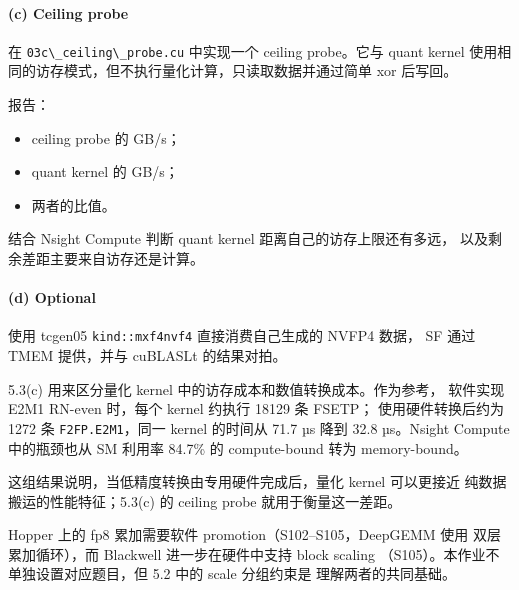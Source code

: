 \documentclass[11pt,a4paper,fontset=none]{ctexart}
\providecommand{\tightlist}{\setlength{\itemsep}{0pt}\setlength{\parskip}{0pt}}
\providecommand{\passthrough}[1]{#1}
\begin{document}
\hypertarget{c-ceiling-probe}{%
\paragraph{(c) Ceiling probe}\label{c-ceiling-probe}}

在 \passthrough{\lstinline!03c\_ceiling\_probe.cu!} 中实现一个 ceiling
probe。它与 quant kernel
使用相同的访存模式，但不执行量化计算，只读取数据并通过简单 xor 后写回。

报告：

\begin{itemize}
\tightlist
\item
  ceiling probe 的 GB/s；
\item
  quant kernel 的 GB/s；
\item
  两者的比值。
\end{itemize}

结合 Nsight Compute 判断 quant kernel 距离自己的访存上限还有多远，
以及剩余差距主要来自访存还是计算。

\hypertarget{d-optional}{%
\paragraph{(d) Optional}\label{d-optional}}

使用 tcgen05 \passthrough{\lstinline!kind::mxf4nvf4!} 直接消费自己生成的
NVFP4 数据， SF 通过 TMEM 提供，并与 cuBLASLt 的结果对拍。

\begin{lookback}

5.3(c) 用来区分量化 kernel 中的访存成本和数值转换成本。作为参考，
软件实现 E2M1 RN-even 时，每个 kernel 约执行 18129 条 FSETP；
使用硬件转换后约为 1272 条 \passthrough{\lstinline!F2FP.E2M1!}，同一
kernel 的时间从 71.7 µs 降到 32.8 µs。Nsight Compute 中的瓶颈也从 SM
利用率 84.7\% 的 compute-bound 转为 memory-bound。

这组结果说明，当低精度转换由专用硬件完成后，量化 kernel 可以更接近
纯数据搬运的性能特征；5.3(c) 的 ceiling probe 就用于衡量这一差距。

Hopper 上的 fp8 累加需要软件 promotion（S102--S105，DeepGEMM 使用
双层累加循环），而 Blackwell 进一步在硬件中支持 block scaling
（S105）。本作业不单独设置对应题目，但 5.2 中的 scale 分组约束是
理解两者的共同基础。

\end{lookback}
\end{document}
